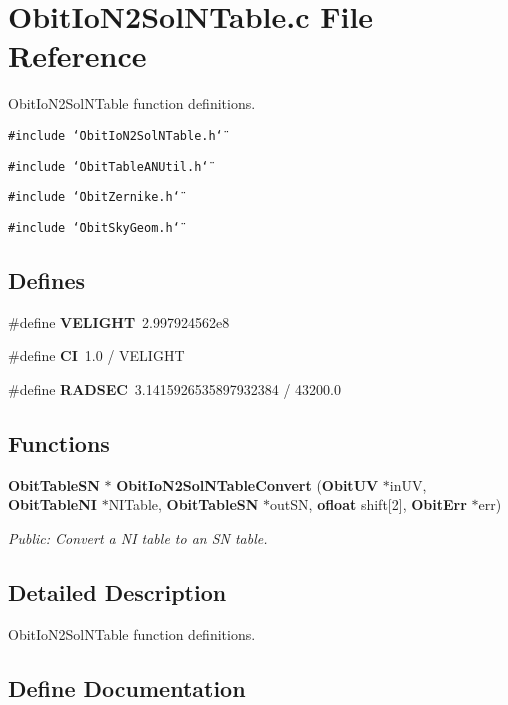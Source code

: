 \section{Obit\-Io\-N2Sol\-NTable.c File Reference}
\label{ObitIoN2SolNTable_8c}
Obit\-Io\-N2Sol\-NTable function definitions. 

{\tt \#include \char`\"{}Obit\-Io\-N2Sol\-NTable.h\char`\"{}}\par
{\tt \#include \char`\"{}Obit\-Table\-ANUtil.h\char`\"{}}\par
{\tt \#include \char`\"{}Obit\-Zernike.h\char`\"{}}\par
{\tt \#include \char`\"{}Obit\-Sky\-Geom.h\char`\"{}}\par
\subsection*{Defines}
\begin{CompactItemize}
\item 
\#define {\bf VELIGHT}\ 2.997924562e8
\item 
\#define {\bf CI}\ 1.0 / VELIGHT
\item 
\#define {\bf RADSEC}\ 3.1415926535897932384 / 43200.0
\end{CompactItemize}
\subsection*{Functions}
\begin{CompactItemize}
\item 
{\bf Obit\-Table\-SN} $\ast$ {\bf Obit\-Io\-N2Sol\-NTable\-Convert} ({\bf Obit\-UV} $\ast$in\-UV, {\bf Obit\-Table\-NI} $\ast$NITable, {\bf Obit\-Table\-SN} $\ast$out\-SN, {\bf ofloat} shift[2], {\bf Obit\-Err} $\ast$err)
\begin{CompactList}\small\item\em Public: Convert a NI table to an SN table. \item\end{CompactList}\end{CompactItemize}


\subsection{Detailed Description}
Obit\-Io\-N2Sol\-NTable function definitions. 



\subsection{Define Documentation}
